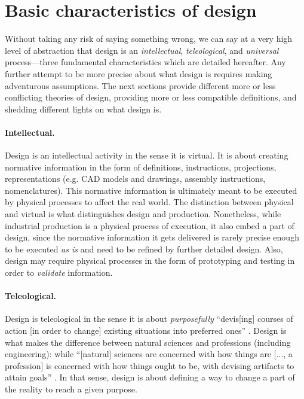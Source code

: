 \documentclass{article}
\begin{document}
\section{Basic characteristics of design}
\label{sec:whatisdesign}

Without taking any risk of saying something wrong, we can say at a very high level of abstraction that design is an \emph{intellectual}, \emph{teleological}, and \emph{universal} process---three fundamental characteristics which are detailed hereafter. Any further attempt to be more precise about what design is requires making adventurous assumptions. The next sections provide different more or less conflicting theories of design, providing more or less compatible definitions, and shedding different lights on what design is. 

\paragraph{Intellectual.} Design is an intellectual activity in the sense it is virtual. It is about creating normative information in the form of definitions, instructions, projections, representations (e.g. CAD models and drawings, assembly instructions, nomenclatures). This normative information is ultimately meant to be executed by physical processes to affect the real world. The distinction between physical and virtual is what distinguishes design and production. Nonetheless, while industrial production is a physical process of execution, it also embed a part of design, since the normative information it gets delivered is rarely precise enough to be executed \emph{as is} and need to be refined by further detailed design. Also, design may require physical processes in the form of prototyping and testing in order to \emph{validate} information.

\paragraph{Teleological.} Design is teleological in the sense it is about \emph{purposefully} ``devis[ing] courses of action [in order to change] existing situations into preferred ones'' \cite[p. 111]{simon1996sciences}. Design is what makes the difference between natural sciences and professions (including engineering): while ``[natural] sciences are concerned with how things are [..., a profession] is concerned with how things ought to be, with devising artifacts to attain goals'' \cite[p. 114]{simon1996sciences}. In that sense, design is about defining a way to change a part of the reality to reach a given purpose. 
\end{document}
